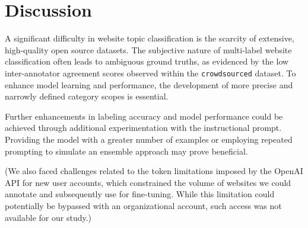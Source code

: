 \section{Discussion}\label{sec:discussion}
A significant difficulty in website topic classification is the scarcity of extensive, high-quality open source datasets. 
The subjective nature of multi-label website classification often leads to ambiguous ground truths, as evidenced by the low inter-annotator agreement scores observed within the \texttt{crowdsourced} dataset. 
To enhance model learning and performance, the development of more precise and narrowly defined category scopes is essential.

Further enhancements in labeling accuracy and model performance could be achieved through additional experimentation with the instructional prompt. 
Providing the model with a greater number of examples or employing repeated prompting to simulate an ensemble approach may prove beneficial.

(We also faced challenges related to the token limitations imposed by the OpenAI API for new user accounts, which constrained the volume of websites we could annotate and subsequently use for fine-tuning. 
While this limitation could potentially be bypassed with an organizational account, such access was not available for our study.)
